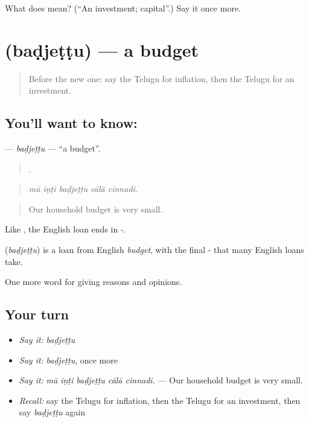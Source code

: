 \begin{tcolorbox}[breakable,colback=teal!4,colframe=teal!35!black,title={Before you move on}]
What does  mean? (\textquotedblleft{}An investment; capital\textquotedblright{}.) Say it once more.
\end{tcolorbox}
\section[\texorpdfstring{\te{బడ్జెట్టు} (baḍjeṭṭu)}{బడ్జెట్టు (baḍjeṭṭu)}]{ (baḍjeṭṭu) — a budget}

\label{lesson:TE-C405-badjettu}



\begin{quote}
Before the new one: say the Telugu for inflation, then the Telugu for an investment.
\end{quote}

\subsection*{You'll want to know: }
\textbf{} — \emph{baḍjeṭṭu} — \textquotedblleft{}a budget\textquotedblright{}.

\begin{quote}
    .
\end{quote}

\begin{quote}
\emph{mā iṇṭi baḍjeṭṭu cālā cinnadi.}
\end{quote}

\begin{quote}
Our household budget is very small.
\end{quote}

Like , the English loan ends in -.

\begin{cousinweb}
\textbf{} (\emph{baḍjeṭṭu}) is a loan from English \emph{budget}, with the final - that many English loans take.
\end{cousinweb}

\begin{grammarlens}[title={What you've built}]
One more word for giving reasons and opinions.
\end{grammarlens}

\subsection*{Your turn}
\begin{itemize}
\raggedright
  \item \emph{Say it:} \emph{baḍjeṭṭu}
  \item \emph{Say it:} \emph{baḍjeṭṭu}, once more
  \item \emph{Say it:} \emph{mā iṇṭi baḍjeṭṭu cālā cinnadi.} — Our household budget is very small.
  \item \emph{Recall:} say the Telugu for inflation, then the Telugu for an investment, then say \emph{baḍjeṭṭu} again
\end{itemize}

